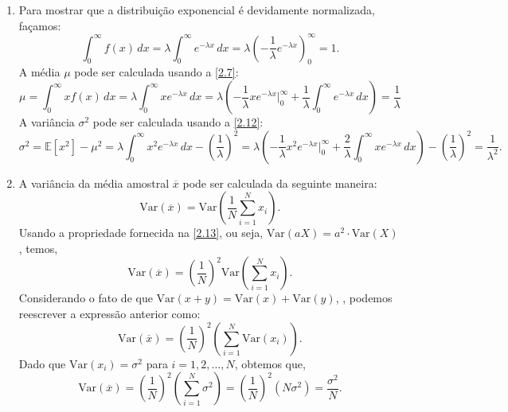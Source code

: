 \begin{enumerate}[label=\textbf{2.\arabic*.}]
	\item Para mostrar que a distribuição exponencial é devidamente normalizada, façamos:
	\begin{equation*}
	\int_0^{\infty} f(x)\, dx = \lambda \int_0^{\infty} e^{-\lambda x}\,dx = \lambda \left(-\dfrac{1}{\lambda}e^{-\lambda x}\right)_0^{\infty} = 1.
	\end{equation*}
	A média $\mu$ pode ser calculada usando a \autoref{2.7}:
	\begin{equation*}
		\mu = \int_{0}^{\infty} x f(x)\, dx = \lambda \int_{0}^{\infty} x e^{-\lambda x}\,dx = \lambda\left(-\dfrac{1}{\lambda}xe^{-\lambda x}\bigg|_{0}^{\infty} + \dfrac{1}{\lambda}\int_{0}^{\infty}e^{-\lambda x}\,dx\right) = \dfrac{1}{\lambda}
	\end{equation*}
	A variância $\sigma^2$ pode ser calculada usando a \autoref{2.12}:
	\begin{equation*}
	\sigma^2 = \mathbb{E}[x^2] - \mu^2 = \lambda\int_{0}^{\infty} x^2 e^{-\lambda x}\, dx - \left(\dfrac{1}{\lambda}\right)^2 = \lambda\left(-\dfrac{1}{\lambda}x^2e^{-\lambda x}\bigg|_{0}^{\infty} + \dfrac{2}{\lambda} \int_{0}^{\infty} xe^{-\lambda x}\,dx\right) - \left(\dfrac{1}{\lambda}\right)^2 = \dfrac{1}{\lambda^2}.
	\end{equation*}
	
	\item A variância da média amostral $\overline{x}$ pode ser calculada da seguinte maneira:
	\begin{equation*}
	\text{Var}(\overline{x}) = \text{Var}\left(\dfrac{1}{N} \sum_{i=1}^{N} x_i\right).
	\end{equation*}
	Usando a propriedade fornecida na \autoref{2.13}, ou seja, $\text{Var}(aX) = a^2 \cdot \text{Var}(X)$, temos,
	\begin{equation*}
		\text{Var}(\overline{x}) = \left(\dfrac{1}{N}\right)^2\text{Var}\left(\sum_{i=1}^{N} x_i\right).
	\end{equation*}
	Considerando o fato de que $\text{Var}(x + y) = \text{Var}(x) +  \text{Var}(y)$, , podemos reescrever a expressão anterior como:
	\begin{equation*}
		\text{Var}(\overline{x}) = \left(\dfrac{1}{N}\right)^2\left(\sum_{i=1}^{N} \text{Var}(x_i)\right).
	\end{equation*}
	Dado que $\text{Var}(x_i) = \sigma^2$ para $i = 1,2,\ldots,N$, obtemos que,
	\begin{equation*}
		\text{Var}(\overline{x}) = \left(\dfrac{1}{N}\right)^2\left(\sum_{i=1}^{N} \sigma^2\right) = \left(\dfrac{1}{N}\right)^2 \left(N\sigma^2\right) = \dfrac{\sigma^2}{N}.
	\end{equation*}
\end{enumerate}